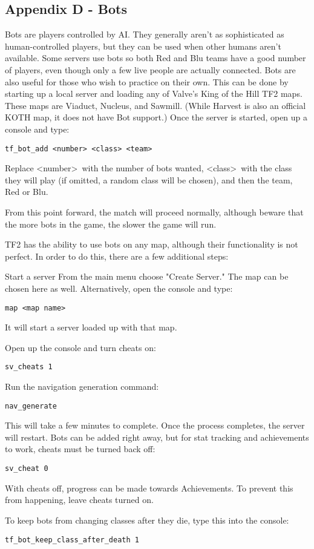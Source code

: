 \subsection{Appendix D - Bots}
Bots are players controlled by AI.  They generally aren't as sophisticated as human-controlled players, but they can be used when other humans aren't available.  Some servers use bots so both Red and Blu teams have a good number of players, even though only a few live people are actually connected.  Bots are also useful for those who wish to practice on their own.  This can be done by starting up a local server and loading any of Valve's King of the Hill TF2 maps. These maps are Viaduct, Nucleus, and Sawmill.  (While Harvest is also an official KOTH map, it does not have Bot support.)  Once the server is started, open up a console and type:
\begin{lstlisting}
tf_bot_add <number> <class> <team>
\end{lstlisting}
Replace \textless number\textgreater~with the number of bots wanted, \textless class\textgreater~with the class they will play (if omitted, a random class will be chosen), and then the team, Red or Blu.

From this point forward, the match will proceed normally, although beware that the more bots in the game, the slower the game will run.

TF2 has the ability to use bots on any map, although their functionality is not perfect.  In order to do this, there are a few additional steps:

Start a server From the main menu choose "Create Server."  The map can be chosen here as well.  Alternatively, open the console and type:
\begin{lstlisting}
map <map name>
\end{lstlisting}
It will start a server loaded up with that map.

Open up the console and turn cheats on:
\begin{lstlisting}
sv_cheats 1
\end{lstlisting}
Run the navigation generation command:
\begin{lstlisting}
nav_generate
\end{lstlisting}
This will take a few minutes to complete.  Once the process completes, the server will restart.  Bots can be added right away, but for stat tracking and achievements to work, cheats must be turned back off:
\begin{lstlisting}
sv_cheat 0
\end{lstlisting}
With cheats off, progress can be made towards Achievements.  To prevent this from happening, leave cheats turned on.

To keep bots from changing classes after they die, type this into the console:
\begin{lstlisting}
tf_bot_keep_class_after_death 1
\end{lstlisting}